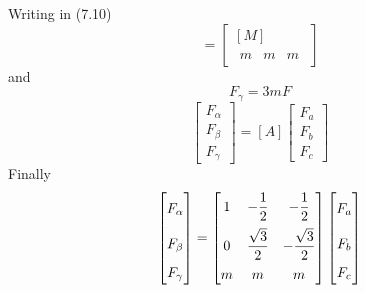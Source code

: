 \documentclass[a4paper,numbers=noenddot,12pt]{scrbook}
\begin{document}
        Writing in (7.10)
        \begin{equation*}
            [A] = 
            \begin{bmatrix}
                [M] \\
                \begin{matrix}
                    m & m & m
                \end{matrix}
            \end{bmatrix}
        \end{equation*}
        and
        \begin{equation*}
            F_{\gamma} = 3 m F
        \end{equation*}
        \begin{equation}
            \begin{bmatrix}
                F_{\alpha} \\ F_{\beta} \\ F_{\gamma}
            \end{bmatrix}
            = [A]
            \begin{bmatrix}
                F_a \\ F_b \\ F_c
            \end{bmatrix}
            \label{eq:Eq7.12}
        \end{equation}
        Finally
        \begin{equation}
            \begin{bmatrix}
                F_{\alpha} \vphantom{\dfrac{1}{2}} \\[2ex]
                F_{\beta} \vphantom{\dfrac{1}{2}} \\[2ex]
                F_{\gamma} 
            \end{bmatrix}
            =
            \begin{bmatrix}
                1  & - \dfrac{1}{2} & - \dfrac{1}{2} \\[2ex]
                0 & \dfrac{\sqrt{3}}{2} & - \dfrac{\sqrt{3}}{2} \\[2ex]
                m & m & m
            \end{bmatrix}
            \begin{bmatrix}
                F_a \vphantom{\dfrac{1}{2}} \\[2ex]
                F_b \vphantom{\dfrac{1}{2}} \\[2ex]
                F_c 
            \end{bmatrix}
            \label{eq:Eq7.13}
        \end{equation}
\end{document}
